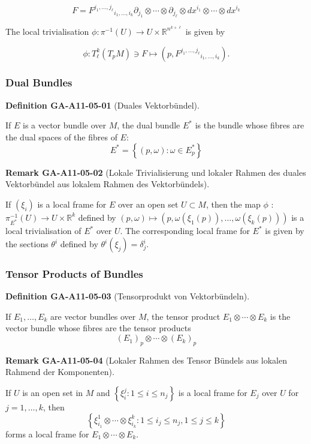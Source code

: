 \documentclass[10pt, letterpaper]{article}
\newcommand{\CustomHeading}[3]{%
  \par\medskip\noindent%
  \textbf{#1 #2} \textnormal{(#3)}.\enskip%
}
\newenvironment{DEF}[2]{\begin{unitbox}\CustomHeading{Definition}{#1}{#2}}{\end{unitbox}}
\newenvironment{REM}[2]{\begin{unitbox}\CustomHeading{Remark}{#1}{#2}}{\end{unitbox}}
\begin{document}
$$
F=F^{j_{1}, \ldots, j_{\ell}}{ }_{i_{1}, \ldots, i_{k}} \partial_{j_{1}} \otimes \cdots \otimes \partial_{j_{\ell}} \otimes d x^{i_{1}} \otimes \cdots \otimes d x^{i_{k}}
$$

The local trivialisation $\phi: \pi^{-1}(U) \rightarrow U \times \mathbb{R}^{n^{k+\ell}}$ is given by

$$
\phi: T_{\ell}^{k}\left(T_{p} M\right) \ni F \longmapsto\left(p, F^{j_{1}, \ldots, j_{\ell}}{ }_{i_{1}, \ldots, i_{k}}\right) .
$$



\subsubsection*{Dual Bundles}


\begin{DEF}{GA-A11-05-01}{Duales Vektorbündel}
If $E$ is a vector bundle over $M$, the dual bundle $E^{*}$ is the bundle whose fibres are the dual spaces of the fibres of $E$:
$$
E^{*}=\left\{(p, \omega): \omega \in E_{p}^{*}\right\}
$$
\end{DEF}

\begin{REM}{GA-A11-05-02}{Lokale Trivialisierung und lokaler Rahmen des duales Vektorbündel aus lokalem Rahmen des Vektorbündels}
If $\left(\xi_{i}\right)$ is a local frame for $E$ over an open set $U \subset M$, then the map $\phi$ : $\pi_{E^{*}}^{-1}(U) \rightarrow U \times \mathbb{R}^{k}$ defined by $(p, \omega) \mapsto\left(p, \omega\left(\xi_{1}(p)\right), \ldots, \omega\left(\xi_{k}(p)\right)\right)$ is a local trivialisation of $E^{*}$ over $U$. The corresponding local frame for $E^{*}$ is given by the sections $\theta^{i}$ defined by $\theta^{i}\left(\xi_{j}\right)=\delta_{j}^{i}$.
\end{REM}

\subsubsection*{Tensor Products of Bundles}


\begin{DEF}{GA-A11-05-03}{Tensorprodukt von Vektorbündeln}
If $E_{1}, \ldots, E_{k}$ are vector bundles over $M$, the tensor product $E_{1} \otimes \cdots \otimes E_{k}$ is the vector bundle whose fibres are the tensor products 
$$\left(E_{1}\right)_{p} \otimes \cdots \otimes\left(E_{k}\right)_{p}$$
\end{DEF} 

\begin{REM}{GA-A11-05-04}{Lokaler Rahmen des Tensor Bündels aus lokalen Rahmend der Komponenten}
If $U$ is an open set in $M$ and $\left\{\xi_{i}^{j}: 1 \leq i \leq n_{j}\right\}$ is a local frame for $E_{j}$ over $U$ for $j=1, \ldots, k$, then 
$$\left\{\xi_{i_{1}}^{1} \otimes \cdots \otimes \xi_{i_{k}}^{k}: 1 \leq i_{j} \leq n_{j}, 1 \leq j \leq k\right\}$$ 
forms a local frame for $E_{1} \otimes \cdots \otimes E_{k}$.
\end{REM}
\end{document}
